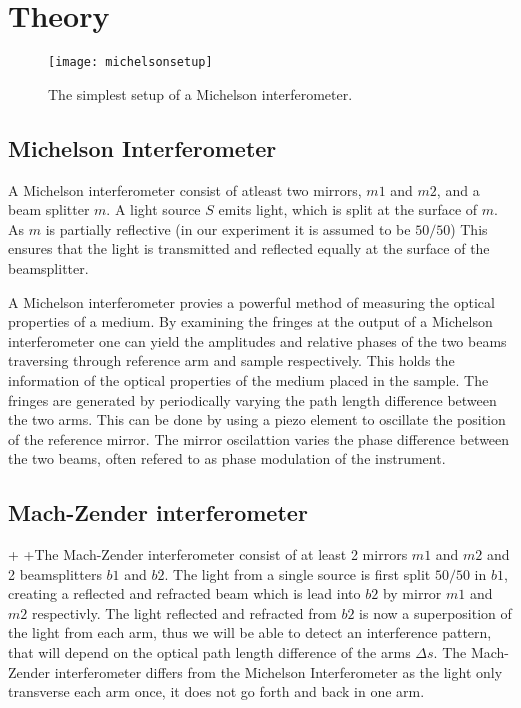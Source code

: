 \section{Theory}
\begin{figure*}
    \centering
    \texttt{[image: michelsonsetup]}
    \caption{The simplest setup of a Michelson interferometer.}
    \label{fig:configuration}
\end{figure*}
\subsection{Michelson Interferometer}
A Michelson interferometer consist of atleast two mirrors, $m1$ and $m2$, and a beam splitter $m$. A light source $S$ emits light, which is split at the surface of $m$. As $m$ is partially reflective (in our experiment it is assumed to be $50/50$) This ensures that the light is transmitted and reflected equally at the surface of the beamsplitter.

A Michelson interferometer provies a powerful method of measuring the optical properties of a medium. By examining the fringes at the output of a Michelson interferometer one can yield the amplitudes and relative phases of the two beams traversing through reference arm and sample respectively. This holds the information of the optical properties of the medium placed in the sample. The fringes are generated by periodically varying the path length difference between the two arms. This can be done by using a piezo element to oscillate the position of the reference mirror. The mirror oscilattion varies the phase difference between the two beams, often refered to as phase modulation of the instrument.


\subsection{Mach-Zender interferometer}
+
+The Mach-Zender interferometer consist of at least 2 mirrors $m1$ and $m2$ and 2 beamsplitters $b1$ and $b2$. The light from a single source is first split $50/50$ in $b1$, creating a reflected and refracted beam which is lead into $b2$ by mirror $m1$ and $m2$ respectivly. The light reflected and refracted from $b2$ is now a superposition of the light from each arm, thus we will be able to detect an interference pattern, that will depend on the optical path length difference of the arms $\Delta s$. The Mach-Zender interferometer differs from the Michelson Interferometer as the light only transverse each arm once, it does not go forth and back in one arm. 

